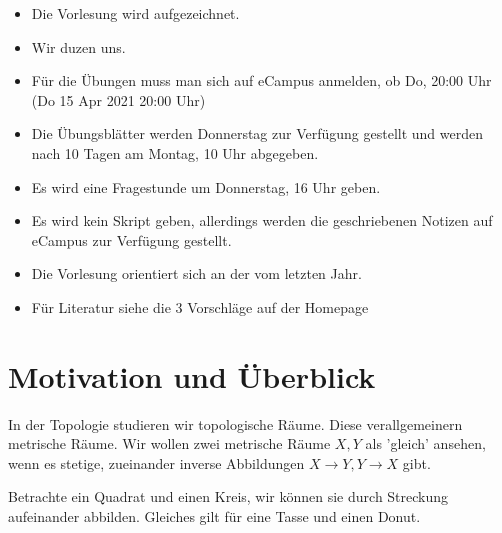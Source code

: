 \begin{orga}
\begin{itemize}
\item    Die Vorlesung wird aufgezeichnet.
\item Wir duzen uns.
\item Für die Übungen muss man sich auf eCampus anmelden, ob Do, 20:00 Uhr (Do 15 Apr 2021 20:00 Uhr)
\item Die Übungsblätter werden Donnerstag zur Verfügung gestellt und werden nach 10 Tagen am Montag, 10 Uhr abgegeben.
\item Es wird eine Fragestunde um Donnerstag, 16 Uhr geben.
\item Es wird kein Skript geben, allerdings werden die geschriebenen Notizen auf eCampus zur Verfügung gestellt.
\item Die Vorlesung orientiert sich an der vom letzten Jahr.
\item Für Literatur siehe die 3 Vorschläge auf der Homepage
\end{itemize}
\end{orga}

\setcounter{section}{-1}

\section{Motivation und Überblick}
In der Topologie studieren wir topologische Räume. Diese verallgemeinern metrische Räume. Wir wollen zwei metrische Räume $X,Y$ als 'gleich' ansehen, wenn es stetige, zueinander inverse Abbildungen  $X \to  Y, Y\to X$ gibt.
\begin{example}
    Betrachte ein Quadrat und einen Kreis, wir können sie durch Streckung aufeinander abbilden. Gleiches gilt für eine Tasse und einen Donut. \\
    \begin{minipage}{\textwidth}
    \centering
    \begin{minipage}{0.45\textwidth}
    \end{minipage}
    \begin{minipage}{0.45\textwidth}
    \end{minipage}
\end{minipage}
\end{example}




